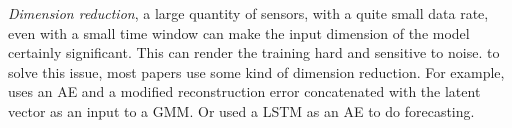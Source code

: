 \documentclass[../../main/main.tex]{subfiles}
\begin{document}
        \textit{Dimension reduction}, a large quantity of sensors, with a quite small data rate, even with a small time window
        can make the input dimension of the model certainly significant. This can render the training hard and sensitive to noise. 
        to solve this issue, most papers use some kind of dimension reduction. For example, \cite{BoZong.2018}  uses an AE and 
        a modified reconstruction error concatenated with the latent vector as an input to a GMM. Or \cite{RueiJieHsieh.2019} used a \ac{LSTM} as
        an AE to do forecasting.

        
    
\end{document}
